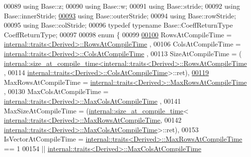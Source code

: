 \begin{DoxyCode}
00089     \textcolor{keyword}{using} Base::z;
00090     \textcolor{keyword}{using} Base::w;
00091     \textcolor{keyword}{using} Base::stride;
00092     \textcolor{keyword}{using} Base::innerStride;
\hyperlink{group___core___module_a5ef049952634d83e1c18bcda3a3e980c}{00093}     \textcolor{keyword}{using} Base::outerStride;
00094     \textcolor{keyword}{using} Base::rowStride;
00095     \textcolor{keyword}{using} Base::colStride;
00096     \textcolor{keyword}{typedef} \textcolor{keyword}{typename} Base::CoeffReturnType CoeffReturnType;
00097 
00098     \textcolor{keyword}{enum} \{
00099 
\hyperlink{group___core___module_acbe29cde3b49701fd0394357a96437a9}{00100}       RowsAtCompileTime = \hyperlink{struct_eigen_1_1internal_1_1traits}{internal::traits<Derived>::RowsAtCompileTime}
      ,
00106       ColsAtCompileTime = \hyperlink{struct_eigen_1_1internal_1_1traits}{internal::traits<Derived>::ColsAtCompileTime}
      ,
00113       SizeAtCompileTime = (
      \hyperlink{struct_eigen_1_1internal_1_1size__at__compile__time}{internal::size\_at\_compile\_time<internal::traits<Derived>::RowsAtCompileTime}
      ,
00114                                                    
      \hyperlink{struct_eigen_1_1internal_1_1traits}{internal::traits<Derived>::ColsAtCompileTime}>::ret),
\hyperlink{group___core___module_a54bec6dbd37bc39602e0b8e1177d0010}{00119}       MaxRowsAtCompileTime = \hyperlink{struct_eigen_1_1internal_1_1traits}{internal::traits<Derived>::MaxRowsAtCompileTime}
      ,
00130       MaxColsAtCompileTime = \hyperlink{struct_eigen_1_1internal_1_1traits}{internal::traits<Derived>::MaxColsAtCompileTime}
      ,
00141       MaxSizeAtCompileTime = (\hyperlink{struct_eigen_1_1internal_1_1size__at__compile__time}{internal::size\_at\_compile\_time}<
      \hyperlink{struct_eigen_1_1internal_1_1traits}{internal::traits<Derived>::MaxRowsAtCompileTime},
00142                                                       
      \hyperlink{struct_eigen_1_1internal_1_1traits}{internal::traits<Derived>::MaxColsAtCompileTime}>::ret),
00153       IsVectorAtCompileTime = \hyperlink{struct_eigen_1_1internal_1_1traits}{internal::traits<Derived>::MaxRowsAtCompileTime}
       == 1
00154                            || \hyperlink{struct_eigen_1_1internal_1_1traits}{internal::traits<Derived>::MaxColsAtCompileTime}

\end{DoxyCode}
